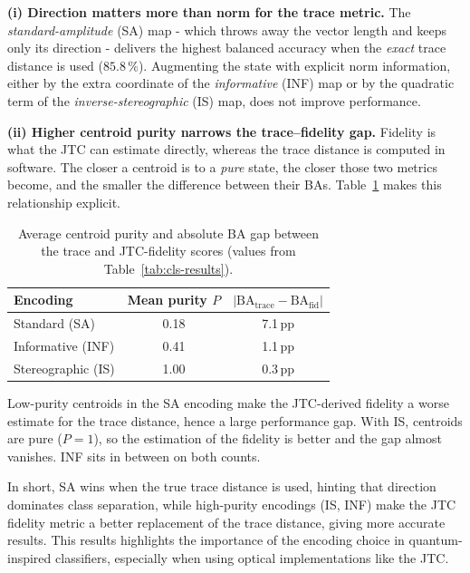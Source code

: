 \documentclass[twocolumn]{article} %
\begin{document}
\medskip
\textbf{(i) Direction matters more than norm for the trace metric.}
The \emph{standard-amplitude} (SA) map - which throws away the vector
length and keeps only its direction - delivers the highest balanced
accuracy when the \emph{exact} trace distance is used
(\(85.8\,\%\)).  Augmenting the state with explicit norm information,
either by the extra coordinate of the \emph{informative} (INF) map or
by the quadratic term of the \emph{inverse-stereographic} (IS) map, does not improve performance.

\medskip
\textbf{(ii) Higher centroid purity narrows the trace–fidelity gap.}
Fidelity is what the JTC can estimate directly, whereas the trace
distance is computed in software.  The closer a centroid is to a \emph{pure}
state, the closer those two metrics become, and the smaller the
difference between their BAs.  Table~\ref{tab:purity-gap} makes this
relationship explicit.

\begin{table}
  \centering
  \caption{Average centroid purity and absolute BA gap between the trace and JTC-fidelity
           scores (values from Table~\ref{tab:cls-results}).}
  \label{tab:purity-gap}
  \begin{tabular}{lcc}
    \toprule
    Encoding & Mean purity \(P\) & \(|\mathrm{BA}_{\text{trace}}-\mathrm{BA}_{\text{fid}}|\) \\ \midrule
    Standard (SA)      & 0.18 & 7.1\,pp \\[2pt]
    Informative (INF)  & 0.41 & 1.1\,pp \\[2pt]
    Stereographic (IS) & 1.00 & 0.3\,pp \\ \bottomrule
  \end{tabular}
\end{table}

Low-purity centroids in the SA encoding make the JTC-derived fidelity a
worse estimate for the trace distance, hence a large performance
gap.  With IS, centroids are pure (\(P=1\)), so the estimation of the fidelity is better and the gap almost vanishes.  INF sits in between on
both counts.

In short, SA wins when the true trace distance is used, hinting
that direction dominates class separation, while high-purity encodings
(IS, INF) make the JTC fidelity metric a better replacement of the trace distance, giving more accurate results. 
This results highlights the importance of the encoding choice in quantum-inspired classifiers, especially when using optical implementations like the JTC.
\end{document}
